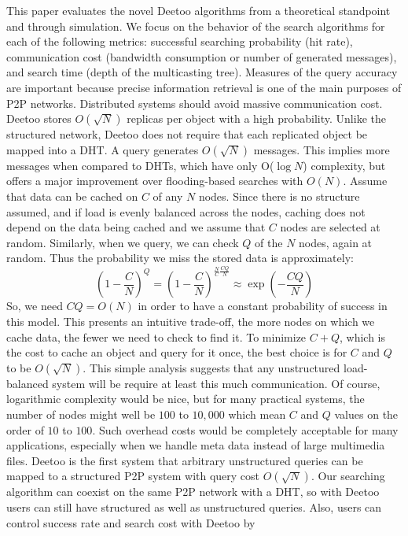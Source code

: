 \documentclass[conference]{IEEEtran}
\begin{document}
This paper evaluates the novel Deetoo algorithms from a theoretical 
standpoint and through simulation. 
We focus on the behavior of the search algorithms for each of the
following metrics: successful searching probability (hit rate),
communication cost (bandwidth consumption or number of
generated messages), and search time (depth of the multicasting tree). 
Measures of the query accuracy are important because precise information 
retrieval is one of the main purposes of P2P networks. 
Distributed systems should avoid massive communication cost. Deetoo stores 
$O(\sqrt{N})$ replicas per object with a high probability. 
Unlike the structured network, Deetoo does not require that each replicated object 
be mapped into a DHT.
A query generates $O(\sqrt{N})$ messages.
This implies more messages when compared to DHTs, which have only O($\log N$) complexity,
but offers a major improvement over flooding-based searches with
$O(N)$.
Assume that data can be cached on $C$ of any $N$ nodes.
Since there is no structure assumed, and if load is evenly
balanced across the nodes,
caching does not depend on the data
being cached and we assume that $C$ nodes are selected at random.  Similarly,
when we query, we can check $Q$ of the $N$ nodes, again at random.  Thus the
probability we miss the stored data is approximately:
\[
\left(1-\frac{C}{N}\right)^Q = \left(1-\frac{C}{N}\right)^{\frac{N}{C}
\frac{CQ}{N}}\approx \exp(-\frac{CQ}{N})
\]
So, we need $CQ = O(N)$ in order to have a constant probability of success in
this model.  This presents an intuitive trade-off, the more nodes on which we
cache data, the fewer we need to check to find it.  To minimize $C+Q$, which
is the cost to cache an object and query for it once, the
best choice is for $C$ and $Q$ to be $O(\sqrt{N})$. 
This simple analysis
suggests that any unstructured load-balanced system will be require at least
this much communication.  Of course, logarithmic complexity would be nice, but
for many practical systems, the number of nodes might well be $100$ to
$10,000$ which mean $C$ and $Q$ values on the order of $10$ to $100$.
Such overhead costs would be completely acceptable for many applications,
 especially when we handle meta data instead of large multimedia files.
Deetoo is the first system that arbitrary unstructured queries can be mapped 
to a structured P2P system with query cost $O(\sqrt{N})$.
Our searching algorithm can coexist on the same P2P network
with a DHT, so with Deetoo
users can still have structured as well as unstructured queries.
Also, users can control success rate and search cost with Deetoo by 
\end{document}
